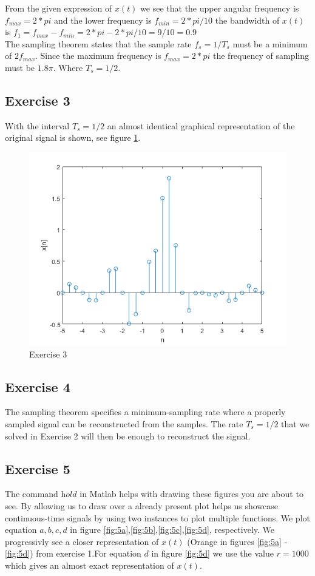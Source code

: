 \documentclass[a4paper]{article}
\begin{document}
From the given expression of $x(t)$ we see that the upper angular frequency is $f_{max} = 2*pi$ and the lower frequency is $f_{min} = 2*pi/10$ the bandwidth of $x(t)$ is $f_1 = f_{max} - f_{min} = 2*pi-2*pi/10 = 9/10 = 0.9$\\
The sampling theorem states that the sample rate $f_s = 1/T_s$ must be a minimum of $2f_{max}$. Since the maximum frequency is $f_{max} = 2*pi$ the frequency of sampling must be $1.8\pi.$ Where $T_s = 1/2$. \\

\subsection{Exercise 3}
With the interval $T_s = 1/2$ an almost identical graphical representation of the original signal is shown, see figure \ref{fig:3}.
\begin{figure}
    \centering
    \includegraphics{3.png}
    \caption{Exercise 3}
    \label{fig:3}
\end{figure}

\subsection{Exercise 4}
The sampling theorem specifies a minimum-sampling rate where a properly sampled signal can be reconstructed from the samples. The rate $T_s = 1/2$ that we solved in Exercise 2 will then be enough to reconstruct the signal.

\subsection{Exercise 5}
The command $\textit{hold}$ in Matlab helps with drawing these figures you are about to see. By allowing us to draw over a already present plot helps us showcase continuous-time signals by using two instances to plot multiple functions.
We plot equation $a,b,c,d$ in figure \ref{fig:5a},\ref{fig:5b},\ref{fig:5c},\ref{fig:5d}, respectively. We progressivly see a closer representation of $x(t)$ (Orange in figures \ref{fig:5a} - \ref{fig:5d}) from exercise 1.For equation $d$ in figure \ref{fig:5d} we use the value $r = 1000$ which gives an almost exact representation of $x(t)$. \\
\end{document}
